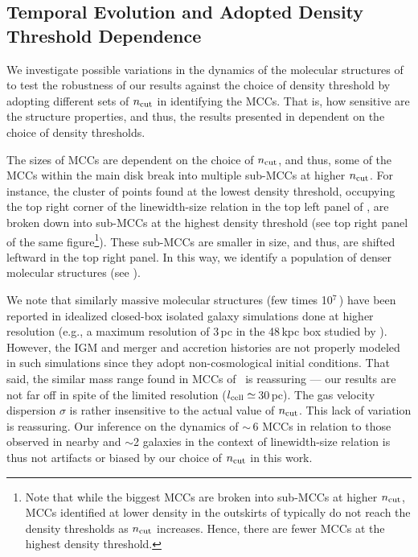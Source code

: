 \IfFileExists{emulateapjlegacy.cls}{\documentclass[iop]{emulateapjlegacy}}{\documentclass[iop]{emulateapj}}
\begin{document}
\subsection{Temporal Evolution and Adopted Density Threshold Dependence}\label{sec:ncut}

We investigate possible variations in the dynamics of the molecular structures of \flower to test the robustness of our results against the 
choice of density threshold by adopting different sets of $n_{\rm cut}$ in identifying the MCCs. That is, how sensitive are the structure properties, and thus, 
the results presented in  dependent on the choice of density thresholds.

The sizes of MCCs are dependent on the choice of $n_{\rm cut}$, 
and thus, some of the MCCs within the main disk break into multiple sub-MCCs at higher $n_{\rm cut}$. 
For instance, the cluster of points found at the lowest density threshold, 
occupying the top right corner of the linewidth-size relation in the top left panel of , 
are broken down into sub-MCCs at the highest density threshold (see top right panel of the same figure\footnote{Note
that while the biggest MCCs are broken into sub-MCCs at higher $n_{\rm cut}$, MCCs identified at lower density in the outskirts of \flower
typically do not reach the density thresholds as $n_{\rm cut}$ increases. Hence, there are fewer MCCs at the highest density threshold.}). 
These sub-MCCs are smaller in size, and thus, are shifted leftward in the top right panel. 
In this way, we identify a population of denser molecular structures (see ). 

We note that similarly massive molecular structures (few times 10$^7$\,\Msun) have been 
reported in idealized closed-box isolated galaxy simulations done at higher resolution (e.g., a maximum
resolution of 3\,pc in the 48\,kpc box studied by \citealt{Behrendt16a}).
However, the IGM and merger and accretion histories are not properly modeled in such simulations since 
they adopt non-cosmological initial conditions. That said, the similar mass range found in MCCs of \flower\ is
reassuring --- our results are not far off in spite of the limited resolution ($l_{\rm cell}\simeq$\,30\,pc).
The gas velocity dispersion $\sigma$ is rather insensitive to the actual value of $n_{\rm cut}$.
This lack of variation is reassuring. Our inference on the dynamics of \z$\sim$\,6 MCCs in relation to those observed in 
nearby and \z$\sim$2 galaxies in the context of linewidth-size relation is thus not artifacts or biased by our choice of $n_{\rm cut}$ in this work. 
\end{document}
